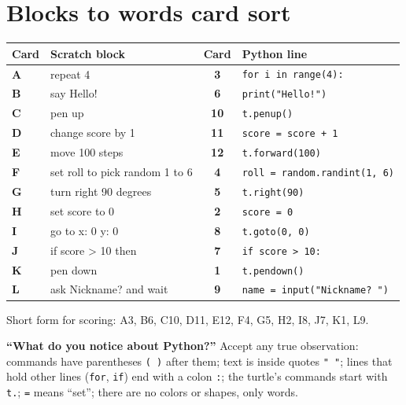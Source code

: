 
\section{Blocks to words card sort}
\begin{answer}
\begin{center}\small
\renewcommand{\arraystretch}{1.2}
\begin{tabular}{@{}l l c l@{}}
\textbf{Card} & \textbf{Scratch block} & \textbf{Card} & \textbf{Python line} \\ \hline
\textbf{A} & repeat 4 & \textbf{3} & \texttt{for i in range(4):} \\
\textbf{B} & say Hello! & \textbf{6} & \texttt{print("Hello!")} \\
\textbf{C} & pen up & \textbf{10} & \texttt{t.penup()} \\
\textbf{D} & change score by 1 & \textbf{11} & \texttt{score = score + 1} \\
\textbf{E} & move 100 steps & \textbf{12} & \texttt{t.forward(100)} \\
\textbf{F} & set roll to pick random 1 to 6 & \textbf{4} & \texttt{roll = random.randint(1, 6)} \\
\textbf{G} & turn right 90 degrees & \textbf{5} & \texttt{t.right(90)} \\
\textbf{H} & set score to 0 & \textbf{2} & \texttt{score = 0} \\
\textbf{I} & go to x: 0 y: 0 & \textbf{8} & \texttt{t.goto(0, 0)} \\
\textbf{J} & if score > 10 then & \textbf{7} & \texttt{if score > 10:} \\
\textbf{K} & pen down & \textbf{1} & \texttt{t.pendown()} \\
\textbf{L} & ask Nickname? and wait & \textbf{9} & \texttt{name = input("Nickname? ")} \\
\end{tabular}
\end{center}
Short form for scoring: A3, B6, C10, D11, E12, F4, G5, H2, I8, J7, K1, L9.

\textbf{\enquote{What do you notice about Python?}} Accept any true observation: commands have parentheses \texttt{( )} after them; text is inside quotes \texttt{" "}; lines that hold other lines (\texttt{for}, \texttt{if}) end with a colon \texttt{:}; the turtle's commands start with \texttt{t.}; \texttt{=} means \enquote{set}; there are no colors or shapes, only words.
\end{answer}

